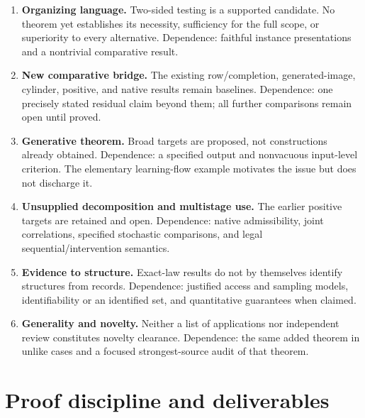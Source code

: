 \documentclass[11pt]{article}
\theoremstyle{remark}
\begin{document}
\begin{enumerate}
\item \textbf{Organizing language.} Two-sided testing is a supported candidate. No theorem yet establishes its necessity, sufficiency for the full scope, or superiority to every alternative. Dependence: faithful instance presentations and a nontrivial comparative result.
\item \textbf{New comparative bridge.} The existing row/completion, generated-image, cylinder, positive, and native results remain baselines. Dependence: one precisely stated residual claim beyond them; all further comparisons remain open until proved.
\item \textbf{Generative theorem.} Broad targets are proposed, not constructions already obtained. Dependence: a specified output and nonvacuous input-level criterion. The elementary learning-flow example motivates the issue but does not discharge it.
\item \textbf{Unsupplied decomposition and multistage use.} The earlier positive targets are retained and open. Dependence: native admissibility, joint correlations, specified stochastic comparisons, and legal sequential/intervention semantics.
\item \textbf{Evidence to structure.} Exact-law results do not by themselves identify structures from records. Dependence: justified access and sampling models, identifiability or an identified set, and quantitative guarantees when claimed.
\item \textbf{Generality and novelty.} Neither a list of applications nor independent review constitutes novelty clearance. Dependence: the same added theorem in unlike cases and a focused strongest-source audit of that theorem.
\end{enumerate}

\section{Proof discipline and deliverables}
\label{sec:discipline}
\end{document}
